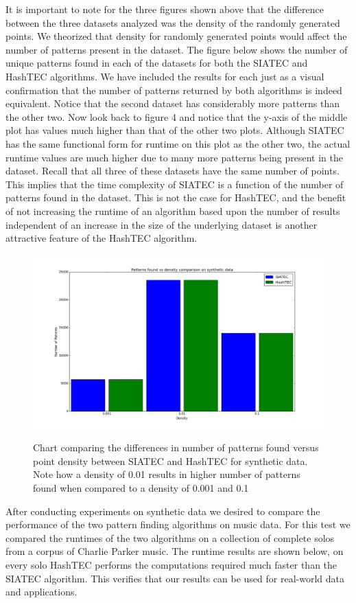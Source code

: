 \documentclass[12pt]{article}
\begin{document}
It is important to note for the three figures shown above that the difference between the three datasets analyzed was the density of the randomly generated points. We theorized that density for randomly generated points would affect the number of patterns present in the dataset. The figure below shows the number of unique patterns found in each of the datasets for both the SIATEC and HashTEC algorithms. We have included the results for each just as a visual confirmation that the number of patterns returned by both algorithms is indeed equivalent. Notice that the second dataset has considerably more patterns than the other two. Now look back to figure 4 and notice that the y-axis of the middle plot has values much higher than that of the other two plots. Although SIATEC has the same functional form for runtime on this plot as the other two, the actual runtime values are much higher due to many more patterns being present in the dataset. Recall that all three of these datasets have the same number of points. This implies that the time complexity of SIATEC is a function of the number of patterns found in the dataset. This is not the case for HashTEC, and the benefit of not increasing the runtime of an algorithm based upon the number of results independent of an increase in the size of the underlying dataset is another attractive feature of the HashTEC algorithm.

\FloatBarrier
\begin{figure}[!htbp]
  \centering
  \includegraphics[width=.8\textwidth]{patterns_found_vs_density_synthetic_data}
  \label{fig:figure5}
  \caption{Chart comparing the differences in number of patterns found versus point density between SIATEC and HashTEC for synthetic data. Note how a density of 0.01 results in higher number of patterns found when compared to a density of 0.001 and 0.1}
\end{figure}
\FloatBarrier

After conducting experiments on synthetic data we desired to compare the performance of the two pattern finding algorithms on music data. For this test we compared the runtimes of the two algorithms on a collection of complete solos from a corpus of Charlie Parker music. The runtime results are shown below, on every solo HashTEC performs the computations required much faster than the SIATEC algorithm. This verifies that our results can be used for real-world data and applications.
\end{document}
